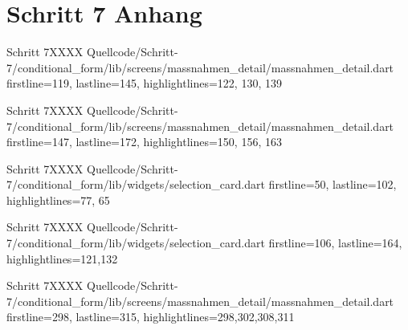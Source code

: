 \chapter{Schritt 7 Anhang}
\label{appendix:Schritt7Anhang}


\begin{alexlisting}{Schritt 7}{XXXX}
    {Quellcode/Schritt-7/conditional_form/lib/screens/massnahmen_detail/massnahmen_detail.dart}
    {firstline=119, lastline=145, highlightlines={122, 130, 139}}
    \label{lst:Schritt7buildSelectionCard}
\end{alexlisting}


\begin{alexlisting}{Schritt 7}{XXXX}
    {Quellcode/Schritt-7/conditional_form/lib/screens/massnahmen_detail/massnahmen_detail.dart}
    {firstline=147, lastline=172, highlightlines={150, 156, 163}}
    \label{lst:Schritt7buildMultiSelectionCard}
\end{alexlisting}


\begin{alexlisting}{Schritt 7}{XXXX}
    {Quellcode/Schritt-7/conditional_form/lib/widgets/selection_card.dart}
    {firstline=50, lastline=102, highlightlines={77, 65}}
    \label{lst:Schritt7validityChangedStreamBuilderChoiceMatcher}
\end{alexlisting}



\begin{alexlisting}{Schritt 7}{XXXX}
    {Quellcode/Schritt-7/conditional_form/lib/widgets/selection_card.dart}
    {firstline=106, lastline=164, highlightlines={121,132}}
    \label{lst:Schritt7createMultipleChoiceSelectionScreenChoiceMatcher}
\end{alexlisting}

\begin{alexlisting}{Schritt 7}{XXXX}
    {Quellcode/Schritt-7/conditional_form/lib/screens/massnahmen_detail/massnahmen_detail.dart}
    {firstline=298, lastline=315, highlightlines={298,302,308,311}}
    \label{lst:Schritt7validateChoices}
\end{alexlisting}